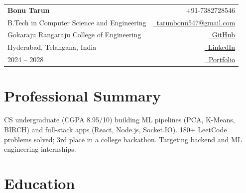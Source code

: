 \documentclass[a4paper,11pt]{article}
\makeatletter
\newcommand{\name}{Bonu Tarun}
\newcommand{\phone}{7382728546}
\newcommand{\emaila}{tarunbonu547@gmail.com}
\makeatother
\begin{document}
\selectfont


\begin{tabularx}{\linewidth}{L r}

    \textbf{\Large \name}
    &
    {\raisebox{0.0\height}{\footnotesize \faPhone}\ +91-\phone}
    \\[1mm]

    {B.Tech in Computer Science and Engineering}
    &
    \href{mailto:\emaila}
    {\raisebox{0.0\height}{\footnotesize \faEnvelope}\ {\emaila}}
    \\[1mm]

    {Gokaraju Rangaraju College of Engineering}
    &
    \href{https://github.com/TarunBonu547}
    {\raisebox{0.0\height}{\footnotesize \faGithub}\ {GitHub}}
    \\[1mm]

    {Hyderabad, Telangana, India}
    &
    \href{https://www.linkedin.com/in/bonu-tarun-38419a371/}
    {\raisebox{0.0\height}{\footnotesize \faLinkedin}\ {LinkedIn}}
    \\[1mm]

    {2024 -- 2028}
    &
    \href{https://tarunbonu.vercel.app/}
    {\raisebox{0.0\height}{\footnotesize \faGlobe}\ {Portfolio}}
    
    \\[1mm]

\end{tabularx}

\section{\textbf{Professional Summary}}

\small{
CS undergraduate (CGPA 8.95/10) building ML pipelines (PCA, K-Means, BIRCH) and full-stack apps (React, Node.js, Socket.IO). 180+ LeetCode problems solved; 3rd place in a college hackathon. Targeting backend and ML engineering internships.
}

\vspace{1mm}


\section{\textbf{Education}}
\end{document}
